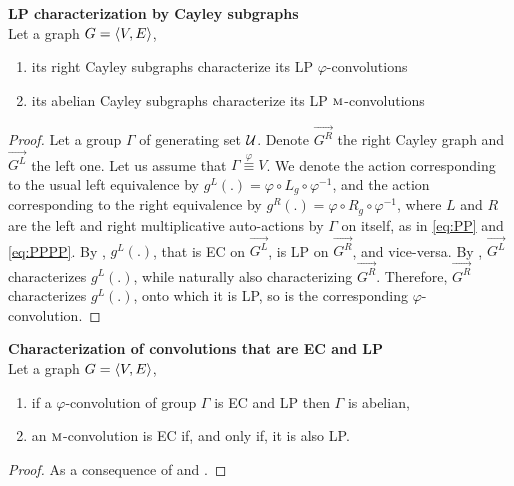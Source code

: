\begin{theorem}\textbf{LP characterization by Cayley subgraphs}\\
Let a graph $G = \langle V, E \rangle$,
\begin{enumerate}[nolistsep,noitemsep,label=(\roman*)]
\item its right Cayley subgraphs characterize its LP $\varphi$-convolutions
\item its abelian Cayley subgraphs characterize its LP $\operatorname{\textsc{m}}$-convolutions
\end{enumerate}
\label{th:cayleycharLP}
\end{theorem}
\begin{proof}
Let a group $\Gamma$ of generating set $\mathcal{U}$. Denote $\vec{G^R}$ the right Cayley graph and $\vec{G^L}$ the left one. Let us assume that $\Gamma \overset\varphi\equiv V$. We denote the action corresponding to the usual left equivalence by $g^L(.) = \varphi \circ L_g \circ \varphi^{-1}$, and the action corresponding to the right equivalence by $g^R(.) = \varphi \circ R_g \circ \varphi^{-1}$, where $L$ and $R$ are the left and right multiplicative auto-actions by $\Gamma$ on itself, as in \eqref{eq:PP} and \eqref{eq:PPPP}. By , $g^L(.)$, that is EC on $\vec{G^L}$, is LP on $\vec{G^R}$, and vice-versa. By , $\vec{G^L}$ characterizes $g^L(.)$, while naturally also characterizing $\vec{G^R}$. Therefore, $\vec{G^R}$ characterizes $g^L(.)$, onto which it is LP, so is the corresponding $\varphi$-convolution.
\end{proof}

\begin{corollary}\textbf{Characterization of convolutions that are EC and LP}\\
Let a graph $G = \langle V, E \rangle$, 
\begin{enumerate}[nolistsep,noitemsep,label=(\roman*)]
\item if a $\varphi$-convolution of group $\Gamma$ is EC and LP then $\Gamma$ is abelian,
\item an $\operatorname{\textsc{m}}$-convolution is EC if, and only if, it is also LP.
\end{enumerate}
\end{corollary}
\begin{proof}
As a consequence of  and .
\end{proof}

